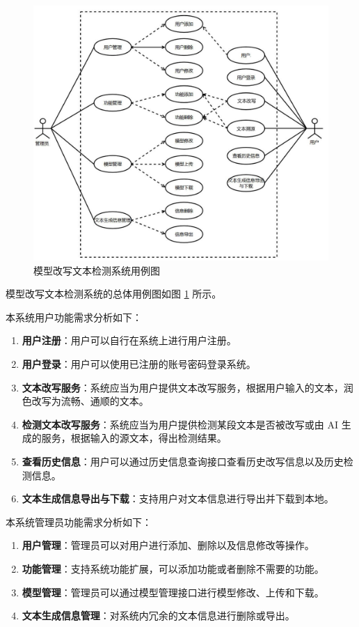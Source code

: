 \begin{figure}[htb]
    \centering
    \includegraphics[width=\textwidth]{figures/sys-use-case.jpg}
    \caption{模型改写文本检测系统用例图}
    \label{fig:sys-use-case}
\end{figure}

模型改写文本检测系统的总体用例图如图 \ref{fig:sys-use-case} 所示。

本系统用户功能需求分析如下：

\begin{enumerate}
\item \textbf{用户注册}：用户可以自行在系统上进行用户注册。
\item \textbf{用户登录}：用户可以使用已注册的账号密码登录系统。
\item \textbf{文本改写服务}：系统应当为用户提供文本改写服务，根据用户输入的文本，润色改写为流畅、通顺的文本。
\item \textbf{检测文本改写服务}：系统应当为用户提供检测某段文本是否被改写或由 AI 生成的服务，根据输入的源文本，得出检测结果。
\item \textbf{查看历史信息}：用户可以通过历史信息查询接口查看历史改写信息以及历史检测信息。
\item \textbf{文本生成信息导出与下载}：支持用户对文本信息进行导出并下载到本地。
\end{enumerate}

本系统管理员功能需求分析如下：

\begin{enumerate}
\item \textbf{用户管理}：管理员可以对用户进行添加、删除以及信息修改等操作。
\item \textbf{功能管理}：支持系统功能扩展，可以添加功能或者删除不需要的功能。
\item \textbf{模型管理}：管理员可以通过模型管理接口进行模型修改、上传和下载。
\item \textbf{文本生成信息管理}：对系统内冗余的文本信息进行删除或导出。
\end{enumerate}

